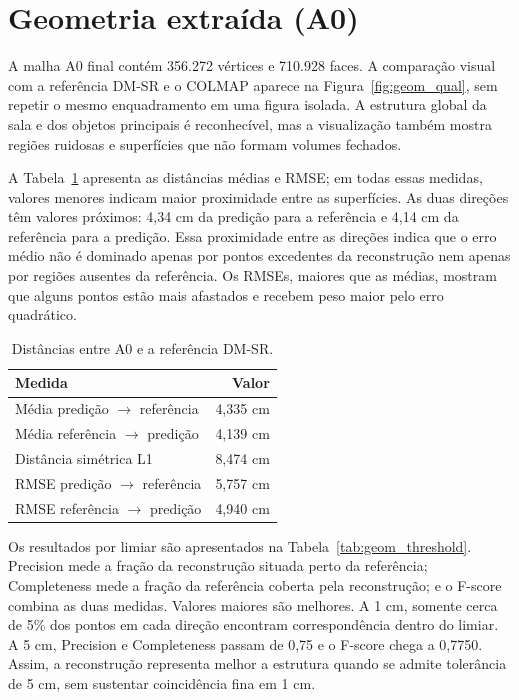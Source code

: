 \section{Geometria extraída (A0)}

A malha A0 final contém 356.272 vértices e 710.928 faces. A comparação visual com a referência DM-SR e o COLMAP aparece na Figura~\ref{fig:geom_qual}, sem repetir o mesmo enquadramento em uma figura isolada. A estrutura global da sala e dos objetos principais é reconhecível, mas a visualização também mostra regiões ruidosas e superfícies que não formam volumes fechados.

A Tabela~\ref{tab:geom_dist} apresenta as distâncias médias e RMSE; em todas essas medidas, valores menores indicam maior proximidade entre as superfícies. As duas direções têm valores próximos: 4,34 cm da predição para a referência e 4,14 cm da referência para a predição. Essa proximidade entre as direções indica que o erro médio não é dominado apenas por pontos excedentes da reconstrução nem apenas por regiões ausentes da referência. Os RMSEs, maiores que as médias, mostram que alguns pontos estão mais afastados e recebem peso maior pelo erro quadrático.

\begin{table}[H]
\centering
\caption{Distâncias entre A0 e a referência DM-SR.}
\label{tab:geom_dist}
\begin{tabular}{lr}
\toprule
\textbf{Medida} & \textbf{Valor} \\
\midrule
Média predição $\rightarrow$ referência & 4,335 cm \\
Média referência $\rightarrow$ predição & 4,139 cm \\
Distância simétrica L1 & 8,474 cm \\
RMSE predição $\rightarrow$ referência & 5,757 cm \\
RMSE referência $\rightarrow$ predição & 4,940 cm \\
\bottomrule
\end{tabular}
\end{table}

Os resultados por limiar são apresentados na Tabela~\ref{tab:geom_threshold}. Precision mede a fração da reconstrução situada perto da referência; Completeness mede a fração da referência coberta pela reconstrução; e o F-score combina as duas medidas. Valores maiores são melhores. A 1 cm, somente cerca de 5\% dos pontos em cada direção encontram correspondência dentro do limiar. A 5 cm, Precision e Completeness passam de 0,75 e o F-score chega a 0,7750. Assim, a reconstrução representa melhor a estrutura quando se admite tolerância de 5 cm, sem sustentar coincidência fina em 1 cm.

